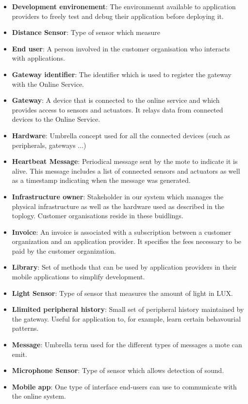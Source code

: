 \documentclass[english,peerreview]{sareport}
\begin{document}
\begin{itemize}
	\item \textbf{Development environement}: The environmennt available to application providers to freely test and debug their application before deploying it.
	\item \textbf{Distance Sensor}: Type of sensor which measure 
	\item \textbf{End user}: A person involved in the customer organisation who interacts with applications.
	\item \textbf{Gateway identifier}: The identifier which is used to register the gateway with the Online Service.
	\item \textbf{Gateway}: A device that is connected to the online service and which provides access to sensors and actuators. It relays data from connected devices to the Online Service.
	\item \textbf{Hardware}: Umbrella concept used for all the connected devices (such as peripherals, gateways ...)
	\item \textbf{Heartbeat Message}: Periodical message sent by the mote to indicate it is alive. This message includes a list of connected sensors and actuators as well as a timestamp indicating when the message was generated.
	\item \textbf{Infrastructure owner}: Stakeholder in our system which manages the physical infrastructure as well as the hardware used as described in the toplogy. Customer organisations reside in these buidlings.
	\item \textbf{Invoice}: An invoice is associated with a subscription between a customer organization and an application provider. It specifies the fees necessary to be paid by the customer organization.
	\item \textbf{Library}: Set of methods that can be used by application providers in their mobile applications to simplify development.
	\item \textbf{Light Sensor}: Type of sensor that measures the amount of light in LUX.
	\item \textbf{Llimited peripheral history}: Small set of peripheral history maintained by the gateway. Useful for application to, for example, learn certain behavourial patterns.
	\item \textbf{Message}: Umbrella term used for the different types of messages a mote can emit.
	\item \textbf{Microphone Sensor}: Type of sensor which allows detection of sound. 
	\item \textbf{Mobile app}: One type of interface end-users can use to communicate with the online system.

\end{itemize}
\end{document}
